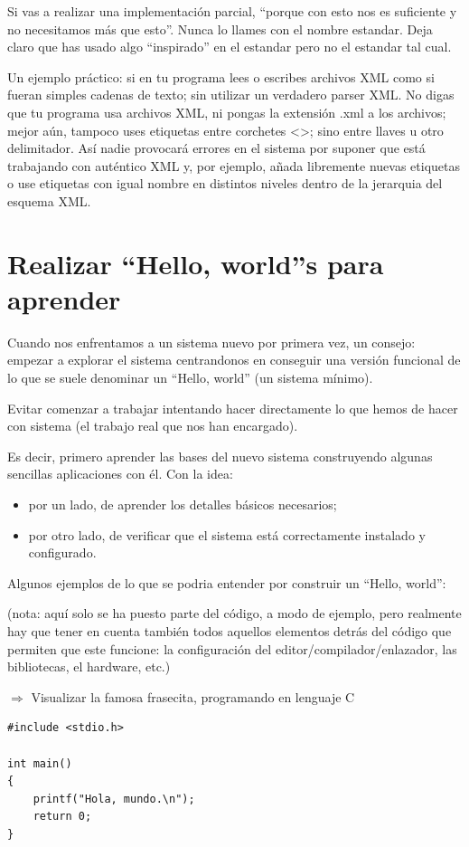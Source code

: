 \documentclass[spanish,12pt,a4paper,final,oneside]{book}
\begin{document}
Si vas a realizar una implementación parcial, ``porque con esto nos es suficiente y no necesitamos más que esto''. Nunca lo llames con el nombre estandar. Deja claro que has usado algo ``inspirado'' en el estandar pero no el estandar tal cual.

Un ejemplo práctico: si en tu programa lees o escribes archivos XML como si fueran simples cadenas de texto; sin utilizar un verdadero parser XML. No digas que tu programa usa archivos XML, ni pongas la extensión .xml a los archivos; mejor aún, tampoco uses etiquetas entre corchetes <>; sino entre llaves {} u otro delimitador. Así nadie provocará errores en el sistema por suponer que está trabajando con auténtico XML y, por ejemplo, añada libremente nuevas etiquetas o use etiquetas con igual nombre en distintos niveles dentro de la jerarquia del esquema XML.


\section{Realizar ``Hello, world''s para aprender}
Cuando nos enfrentamos a un sistema nuevo por primera vez, un consejo: empezar a explorar el sistema centrandonos en conseguir una versión funcional de lo que se suele denominar un ``Hello, world'' (un sistema mínimo).  

Evitar comenzar a trabajar intentando hacer directamente lo que hemos de hacer con sistema (el trabajo real que nos han encargado).

Es decir, primero aprender las bases del nuevo sistema construyendo algunas sencillas aplicaciones con él. Con la idea:
\begin{itemize}
\item por un lado, de aprender los detalles básicos necesarios;
\item por otro lado, de verificar que el sistema está correctamente instalado y configurado. 
\end{itemize}

Algunos ejemplos de lo que se podria entender por construir un ``Hello, world'':
\begin{footnotesize}(nota: aquí solo se ha puesto parte del código, a modo de ejemplo, pero realmente hay que tener en cuenta también todos aquellos elementos detrás del código que permiten que este funcione: la configuración del editor/compilador/enlazador, las bibliotecas, el hardware, etc.)\end{footnotesize}
 
$\Rightarrow$ Visualizar la famosa frasecita, programando en lenguaje C
\begin{lstlisting}[frame=single]
#include <stdio.h>
 
int main()
{
    printf("Hola, mundo.\n");
    return 0;
}
\end{lstlisting}
\end{document}
